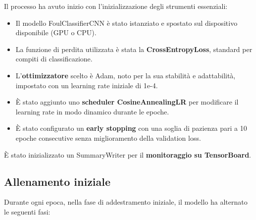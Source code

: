 \documentclass[main.tex]{subfiles}
\begin{document}
\noindent Il processo ha avuto inizio con l’inizializzazione degli strumenti essenziali:

\begin{itemize}
    \item Il modello FoulClassifierCNN è stato istanziato e spostato sul dispositivo disponibile (GPU o CPU).
    \item La funzione di perdita utilizzata è stata la \textbf{CrossEntropyLoss}, standard per compiti di classificazione.
    \item L’\textbf{ottimizzatore} scelto è Adam, noto per la sua stabilità e adattabilità, impostato con un learning rate iniziale di 1e-4.
    \item È stato aggiunto uno \textbf{scheduler CosineAnnealingLR} per modificare il learning rate in modo dinamico durante le epoche.
    \item È stato configurato un \textbf{early stopping} con una soglia di pazienza pari a 10 epoche consecutive senza miglioramento della validation loss.
\end{itemize}
È stato inizializzato un SummaryWriter per il \textbf{monitoraggio su TensorBoard}.

\subsection{Allenamento iniziale}
Durante ogni epoca, nella fase di addestramento iniziale, il modello ha alternato le seguenti fasi:
\end{document}
